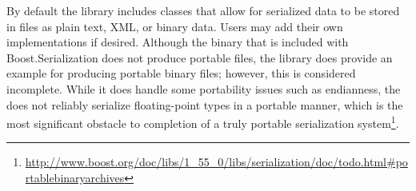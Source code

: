 By default the library includes  classes that allow for serialized data to be stored in files as plain text, XML, or binary data. Users may add their own  implementations if desired. Although the binary  that is included with Boost.Serialization does not produce portable files, the library does provide an example  for producing portable binary files; however, this  is considered incomplete. While it does handle some portability issues such as endianness, the  does not reliably serialize floating-point types in a portable manner, which is the most significant obstacle to completion of a truly portable serialization system\footnote{\url{http://www.boost.org/doc/libs/1_55_0/libs/serialization/doc/todo.html#portablebinaryarchives}}.

\newpage
\noindent
\begin{minipage}{\linewidth}
\begin{singlespace}
	
\end{singlespace}
\end{minipage}